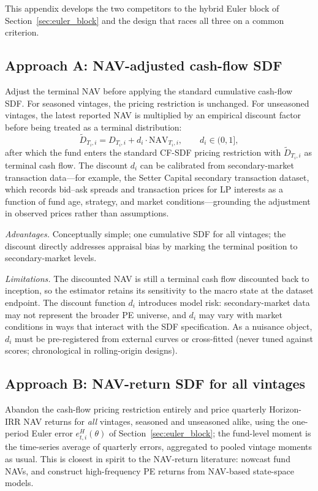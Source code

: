 \documentclass[11pt]{article}
\begin{document}
This appendix develops the two competitors to the hybrid Euler block of Section~\ref{sec:euler_block} and the design that races all three on a common criterion.

\subsection{Approach A: NAV-adjusted cash-flow SDF}
\label{app:nav_adjusted}

Adjust the terminal NAV before applying the standard cumulative cash-flow SDF. For seasoned vintages, the pricing restriction is unchanged. For unseasoned vintages, the latest reported NAV is multiplied by an empirical discount factor before being treated as a terminal distribution:
\[
\widetilde{D}_{T_i,i} = D_{T_i,i} + d_i \cdot \mathrm{NAV}_{T_i,i},
\qquad d_i\in(0,1],
\]
after which the fund enters the standard CF-SDF pricing restriction with \(\widetilde D_{T_i,i}\) as terminal cash flow. The discount \(d_i\) can be calibrated from secondary-market transaction data---for example, the Setter Capital secondary transaction dataset, which records bid--ask spreads and transaction prices for LP interests as a function of fund age, strategy, and market conditions---grounding the adjustment in observed prices rather than assumptions.

\emph{Advantages.} Conceptually simple; one cumulative SDF for all vintages; the discount directly addresses appraisal bias by marking the terminal position to secondary-market levels.

\emph{Limitations.} The discounted NAV is still a terminal cash flow discounted back to inception, so the estimator retains its sensitivity to the macro state at the dataset endpoint. The discount function \(d_i\) introduces model risk: secondary-market data may not represent the broader PE universe, and \(d_i\) may vary with market conditions in ways that interact with the SDF specification. As a nuisance object, \(d_i\) must be pre-registered from external curves or cross-fitted (never tuned against scores; chronological in rolling-origin designs).

\subsection{Approach B: NAV-return SDF for all vintages}
\label{app:nav_return}

Abandon the cash-flow pricing restriction entirely and price quarterly Horizon-IRR NAV returns for \emph{all} vintages, seasoned and unseasoned alike, using the one-period Euler error \(e^H_{t,i}(\theta)\) of Section~\ref{sec:euler_block}; the fund-level moment is the time-series average of quarterly errors, aggregated to pooled vintage moments as usual. This is closest in spirit to the NAV-return literature: \citet{brown2023nowcasting} nowcast fund NAVs, and \citet{GhyselsGredilAndreou2025} construct high-frequency PE returns from NAV-based state-space models.
\end{document}
